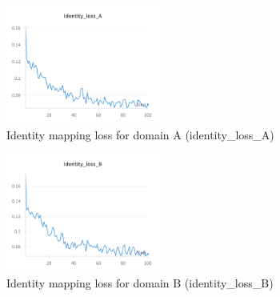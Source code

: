 \documentclass[twocolumn,superscriptaddress,aps]{revtex4-1}
\begin{document}
\begin{figure}[H]
\centering
\includegraphics[width=0.45\textwidth]{assets/identity_loss_A.png}
\caption{Identity mapping loss for domain A (identity\_loss\_A)}
\label{fig:identity_loss_A}
\end{figure}

\begin{figure}[H]
\centering
\includegraphics[width=0.45\textwidth]{assets/identity_loss_B.png}
\caption{Identity mapping loss for domain B (identity\_loss\_B)}
\label{fig:identity_loss_B}
\end{figure}



\end{document}
